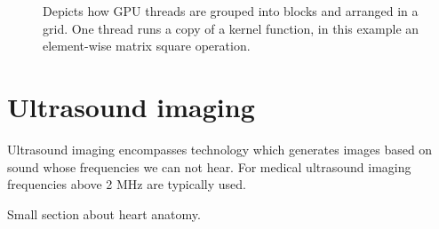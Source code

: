 \begin{figure}
\centering
{}
\caption{Depicts how GPU threads are grouped into blocks and arranged in a grid. One thread runs a copy of a kernel function, in this example an element-wise matrix square operation.}
\label{fig:gpu_grid}
\end{figure}

\section {Ultrasound imaging}\label{sec:ultrasound}
Ultrasound imaging encompasses technology which generates images based on sound whose frequencies we can not hear. For medical ultrasound imaging frequencies above 2 MHz are typically used.

Small section about heart anatomy.


